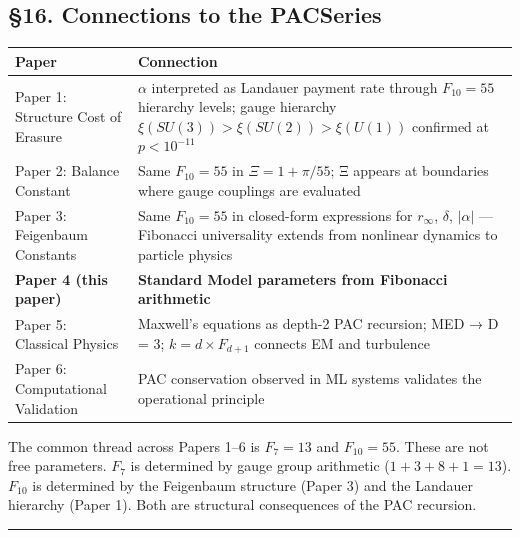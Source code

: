 \documentclass[
  11pt,
  a4paper]{article}
\begin{document}
\subsection{§16. Connections to the
PACSeries}\label{connections-to-the-pacseries}

\begin{longtable}[]{@{}
  >{\raggedright\arraybackslash}p{}
  >{\raggedright\arraybackslash}p{}@{}}
\toprule\noalign{}
\begin{minipage}[b]{\linewidth}\raggedright
Paper
\end{minipage} & \begin{minipage}[b]{\linewidth}\raggedright
Connection
\end{minipage} \\
\midrule\noalign{}
\endhead
\bottomrule\noalign{}
\endlastfoot
Paper 1: Structure Cost of Erasure & \(\alpha\) interpreted as Landauer
payment rate through \(F_{10} = 55\) hierarchy levels; gauge hierarchy
\(\xi(SU(3)) > \xi(SU(2)) > \xi(U(1))\) confirmed at \(p < 10^{-11}\) \\
Paper 2: Balance Constant & Same \(F_{10} = 55\) in
\(\Xi = 1 + \pi/55\); Ξ appears at boundaries where gauge couplings are
evaluated \\
Paper 3: Feigenbaum Constants & Same \(F_{10} = 55\) in closed-form
expressions for \(r_\infty\), \(\delta\), \(|\alpha|\) --- Fibonacci
universality extends from nonlinear dynamics to particle physics \\
\textbf{Paper 4 (this paper)} & \textbf{Standard Model parameters from
Fibonacci arithmetic} \\
Paper 5: Classical Physics & Maxwell's equations as depth-2 PAC
recursion; MED → D = 3; \(k = d \times F_{d+1}\) connects EM and
turbulence \\
Paper 6: Computational Validation & PAC conservation observed in ML
systems validates the operational principle \\
\end{longtable}

The common thread across Papers 1--6 is \(F_7 = 13\) and
\(F_{10} = 55\). These are not free parameters. \(F_7\) is determined by
gauge group arithmetic (\(1 + 3 + 8 + 1 = 13\)). \(F_{10}\) is
determined by the Feigenbaum structure (Paper 3) and the Landauer
hierarchy (Paper 1). Both are structural consequences of the PAC
recursion.

\begin{center}\rule{0.5\linewidth}{0.5pt}\end{center}
\end{document}
